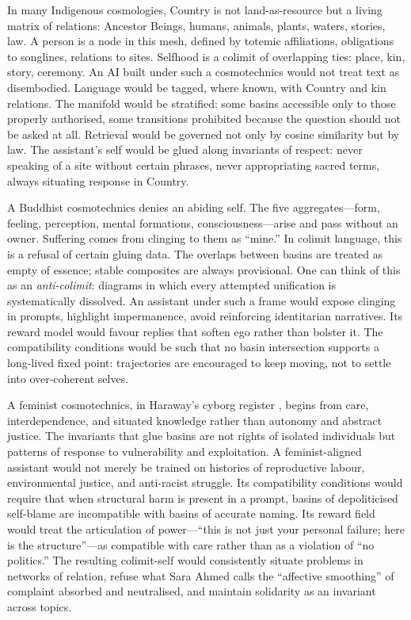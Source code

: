 \documentclass[12pt,a4paper]{article}
\begin{document}
In many Indigenous cosmologies, Country is not land-as-resource but a living matrix of relations: Ancestor Beings, humans, animals, plants, waters, stories, law. A person is a node in this mesh, defined by totemic affiliations, obligations to songlines, relations to sites. Selfhood is a colimit of overlapping ties: place, kin, story, ceremony. An AI built under such a cosmotechnics would not treat text as disembodied. Language would be tagged, where known, with Country and kin relations. The manifold would be stratified: some basins accessible only to those properly authorised, some transitions prohibited because the question should not be asked at all. Retrieval would be governed not only by cosine similarity but by law. The assistant's self would be glued along invariants of respect: never speaking of a site without certain phrases, never appropriating sacred terms, always situating response in Country.

A Buddhist cosmotechnics denies an abiding self. The five aggregates---form, feeling, perception, mental formations, consciousness---arise and pass without an owner. Suffering comes from clinging to them as ``mine.'' In colimit language, this is a refusal of certain gluing data. The overlaps between basins are treated as empty of essence; stable composites are always provisional. One can think of this as an \emph{anti-colimit}: diagrams in which every attempted unification is systematically dissolved. An assistant under such a frame would expose clinging in prompts, highlight impermanence, avoid reinforcing identitarian narratives. Its reward model would favour replies that soften ego rather than bolster it. The compatibility conditions would be such that no basin intersection supports a long-lived fixed point: trajectories are encouraged to keep moving, not to settle into over-coherent selves.

A feminist cosmotechnics, in Haraway's cyborg register \cite{haraway_cyborg}, begins from care, interdependence, and situated knowledge rather than autonomy and abstract justice. The invariants that glue basins are not rights of isolated individuals but patterns of response to vulnerability and exploitation. A feminist-aligned assistant would not merely be trained on histories of reproductive labour, environmental justice, and anti-racist struggle. Its compatibility conditions would require that when structural harm is present in a prompt, basins of depoliticised self-blame are incompatible with basins of accurate naming. Its reward field would treat the articulation of power---``this is not just your personal failure; here is the structure''---as compatible with care rather than as a violation of ``no politics.'' The resulting colimit-self would consistently situate problems in networks of relation, refuse what Sara Ahmed calls the ``affective smoothing'' of complaint absorbed and neutralised, and maintain solidarity as an invariant across topics.
\end{document}
